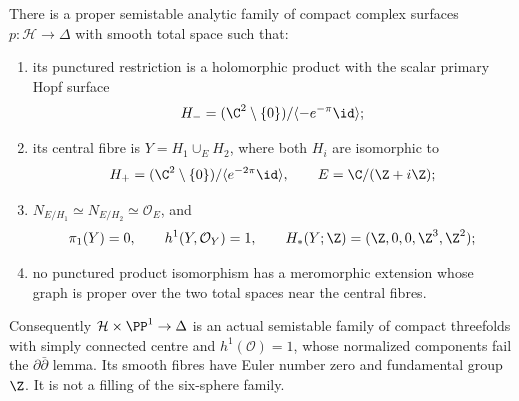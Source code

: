 \begin{proposition}
There is a proper semistable analytic family of compact complex
surfaces $p:\mathcal H\to\Delta$ with smooth total space such that:
\begin{enumerate}
\item its punctured restriction is a holomorphic product with the
scalar primary Hopf surface
\[
 H_-=(\C^2\setminus\{0\})/\langle -e^{-\pi}\id\rangle;
\]
\item its central fibre is $Y=H_1\cup_E H_2$, where both $H_i$
are isomorphic to
\[
 H_+=(\C^2\setminus\{0\})/\langle e^{-2\pi}\id\rangle,
 \qquad E=\C/(\Z+i\Z);
\]
\item $N_{E/H_1}\simeq N_{E/H_2}\simeq\mathcal O_E$, and
\[
 \pi_1(Y)=0,\qquad h^1(Y,\mathcal O_Y)=1,
 \qquad H_*(Y;\Z)=(\Z,0,0,\Z^3,\Z^2);
\]
\item no punctured product isomorphism has a meromorphic extension
whose graph is proper over the two total spaces near the central
fibres.
\end{enumerate}
Consequently $\mathcal H\times\PP^1\to\Delta$ is an actual
semistable family of compact threefolds with simply connected centre
and $h^1(\mathcal O)=1$, whose normalized components fail the
$\partial\bar\partial$ lemma.  Its smooth fibres have Euler number
zero and fundamental group $\Z$.  It is not a filling of the
six-sphere family.
\end{proposition}
